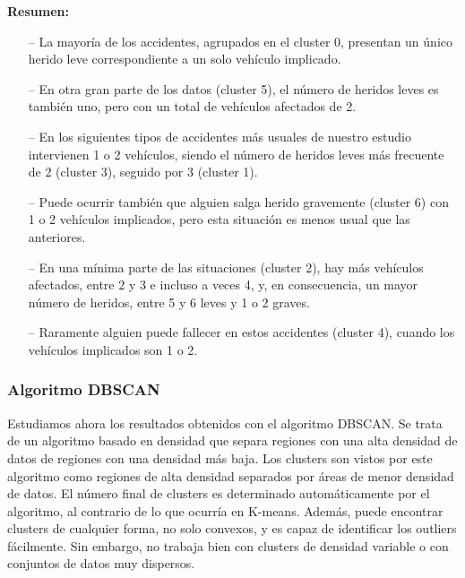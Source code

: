 \documentclass[a4paper,11pt]{book}
\begin{document}
\textbf{Resumen:}
\begin{itemize}
	\item [--] La mayoría de los accidentes, agrupados en el cluster 0, presentan un único herido leve correspondiente a un solo vehículo implicado.
	\item [--] En otra gran parte de los datos (cluster 5), el número de heridos leves es también uno, pero con un total de vehículos afectados de 2. 
	\item [--] En los siguientes tipos de accidentes más usuales de nuestro estudio intervienen 1 o 2 vehículos, siendo el número de heridos leves más frecuente de 2 (cluster 3), seguido por 3 (cluster 1). 
	\item [--] Puede ocurrir también que alguien salga herido gravemente (cluster 6) con 1 o 2 vehículos implicados, pero esta situación es menos usual que las anteriores. 
	\item [--] En una mínima parte de las situaciones (cluster 2), hay más vehículos afectados, entre 2 y 3 e incluso a veces 4, y, en consecuencia, un mayor número de heridos, entre 5 y 6 leves y 1 o 2 graves.
	\item [--] Raramente alguien puede fallecer en estos accidentes (cluster 4), cuando los vehículos implicados son 1 o 2. 
\end{itemize}

\subsubsection{Algoritmo DBSCAN}
Estudiamos ahora los resultados obtenidos con el algoritmo DBSCAN. Se trata de un algoritmo basado en densidad que separa regiones con una alta densidad de datos de regiones con una densidad más baja. Los clusters son vistos por este algoritmo como regiones de alta densidad separados por áreas de menor densidad de datos. El número final de clusters es determinado automáticamente por el algoritmo, al contrario de lo que ocurría en K-means. Además, puede encontrar clusters de cualquier forma, no solo convexos, y es capaz de identificar los outliers fácilmente. Sin embargo, no trabaja bien con clusters de densidad variable o con conjuntos de datos muy dispersos. 
\end{document}
